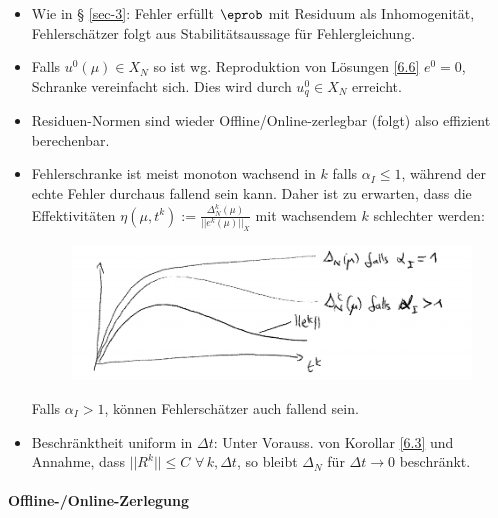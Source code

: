 \begin{bem} \beginwithlistbem
	\begin{itemize}
		\item Wie in § \ref{sec-3}: Fehler erfüllt $\eprob$ mit Residuum als Inhomogenität, Fehlerschätzer folgt aus Stabilitätsaussage für Fehlergleichung.
		\item Falls $u^0(\mu) \in X_N$ so ist wg. Reproduktion von Lösungen \ref{6.6} $e^0 = 0$, Schranke vereinfacht sich. Dies wird durch $u_q^0 \in X_N$ erreicht.
		\item Residuen-Normen sind wieder Offline/Online-zerlegbar (folgt) also effizient berechenbar.
		\item Fehlerschranke ist meist monoton wachsend in $k$ falls $\alpha_I \leq 1$, während der echte Fehler durchaus fallend sein kann. Daher ist zu erwarten, dass die Effektivitäten $\eta(\mu,t^k) := \frac{\Delta_N^k(\mu)}{||e^k(\mu)||_X}$ mit wachsendem $k$ schlechter werden:
\begin{figure}[H]
  \centering\small
    \includegraphics[width = 0.8 \textwidth]{Bilder/Effektivitätsverläufe.png}
  \label{fig:Effektivitätsverläufe}
\end{figure}
Falls $\alpha_I > 1$, können Fehlerschätzer auch fallend sein.
		\item Beschränktheit uniform in $\Delta t$: Unter Vorauss. von Korollar \ref{6.3} und Annahme, dass $||R^k|| \leq C \,\, \forall \, k, \Delta t$, so bleibt $\Delta_N$ für $\Delta t \rightarrow 0$ beschränkt.
	\end{itemize}
\end{bem}

\paragraph*{Offline-/Online-Zerlegung}


